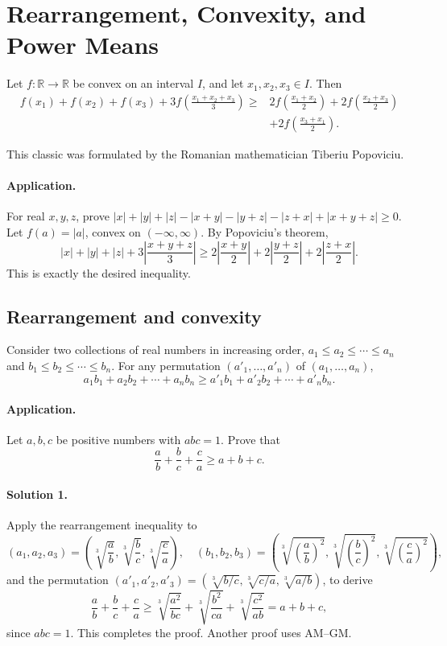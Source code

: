 \documentclass[11pt,a4paper]{article}
\begin{document}
\section*{Rearrangement, Convexity, and Power Means}
\setcounter{theorem}{54}\begin{lemma}
Let $f:\mathbb R\to\mathbb R$ be convex on an interval $I$, and let $x_1,x_2,x_3\in I$.
Then
\begin{align*}
f(x_1)+f(x_2)+f(x_3)+3f\left(\frac{x_1+x_2+x_3}{3}\right)
\geq{}&2f\left(\frac{x_1+x_2}{2}\right)+2f\left(\frac{x_2+x_3}{2}\right)\\
&+2f\left(\frac{x_3+x_1}{2}\right).
\end{align*}
\end{lemma}
This classic was formulated by the Romanian mathematician Tiberiu Popoviciu.
\paragraph{Application.}
For real $x,y,z$, prove
$|x|+|y|+|z|-|x+y|-|y+z|-|z+x|+|x+y+z|\geq0$.
Let $f(a)=|a|$, convex on $(-\infty,\infty)$.
By Popoviciu's theorem,
\[
|x|+|y|+|z|+3\left|\frac{x+y+z}{3}\right|
\geq2\left|\frac{x+y}{2}\right|+2\left|\frac{y+z}{2}\right|+2\left|\frac{z+x}{2}\right|.
\]
This is exactly the desired inequality.

\subsection{Rearrangement and convexity}
\setcounter{theorem}{84}\begin{lemma}\label{lemma:lb1-87}
Consider two collections of real numbers in increasing order,
$a_1\leq a_2\leq\cdots\leq a_n$ and $b_1\leq b_2\leq\cdots\leq b_n$.
For any permutation $(a'_1,\ldots,a'_n)$ of $(a_1,\ldots,a_n)$,
\[a_1b_1+a_2b_2+\cdots+a_nb_n\geq a'_1b_1+a'_2b_2+\cdots+a'_nb_n.\]
\end{lemma}
\paragraph{Application.}
Let $a,b,c$ be positive numbers with $abc=1$. Prove that
\[\frac ab+\frac bc+\frac ca\geq a+b+c.\]
\paragraph{Solution 1.}
Apply the rearrangement inequality to
\[(a_1,a_2,a_3)=\left(\sqrt[3]{\frac ab},\sqrt[3]{\frac bc},\sqrt[3]{\frac ca}\right),
\quad(b_1,b_2,b_3)=\left(\sqrt[3]{\left(\frac ab\right)^2},\sqrt[3]{\left(\frac bc\right)^2},\sqrt[3]{\left(\frac ca\right)^2}\right),\]
and the permutation $(a'_1,a'_2,a'_3)=(\sqrt[3]{b/c},\sqrt[3]{c/a},\sqrt[3]{a/b})$, to derive
\[\frac ab+\frac bc+\frac ca\geq\sqrt[3]{\frac{a^2}{bc}}
+\sqrt[3]{\frac{b^2}{ca}}+\sqrt[3]{\frac{c^2}{ab}}=a+b+c,\]
since $abc=1$. This completes the proof.
Another proof uses AM--GM.
\end{document}

